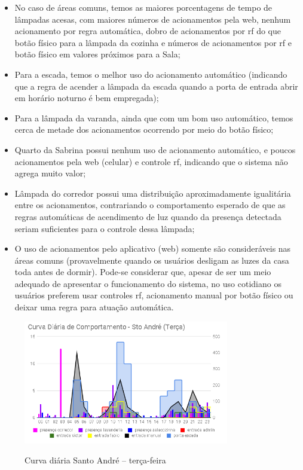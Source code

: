 \begin{itemize}
	\item No caso de áreas comuns, temos as maiores porcentagens de tempo de lâmpadas acesas, com maiores números de acionamentos pela web, nenhum acionamento por regra automática, dobro de acionamentos por rf do que botão físico para a lâmpada da cozinha e números de acionamentos por rf e botão físico em valores próximos para a Sala;
	\item Para a escada, temos o melhor uso do acionamento automático (indicando que a regra de acender a lâmpada da escada quando a porta de entrada abrir em horário noturno é bem empregada);
	\item Para a lâmpada da varanda, ainda que com um bom uso automático, temos cerca de metade dos acionamentos ocorrendo por meio do botão físico;
	\item Quarto da Sabrina possui nenhum uso de acionamento automático, e poucos acionamentos pela web (celular) e controle rf, indicando que o sistema não agrega muito valor;
	\item Lâmpada do corredor possui uma distribuição aproximadamente igualitária entre os acionamentos, contrariando o comportamento esperado de que as regras automáticas de acendimento de luz quando da presença detectada seriam suficientes para o controle dessa lâmpada;
	\item O uso de acionamentos pelo aplicativo (web) somente são consideráveis nas áreas comuns (provavelmente quando os usuários desligam as luzes da casa toda antes de dormir). Pode-se considerar que, apesar de ser um meio adequado de apresentar o funcionamento do sistema, no uso cotidiano os usuários preferem usar controles rf, acionamento manual por botão físico ou deixar uma regra para atuação automática.
\end{itemize}

\begin{figure}[H]
	\centering
	\caption{Curva diária Santo André -- terça-feira}
	\includegraphics[width=0.8\textwidth]{diaStoAndreTerca}
	\label{fig:diaStoAndreTerca}
\end{figure}

